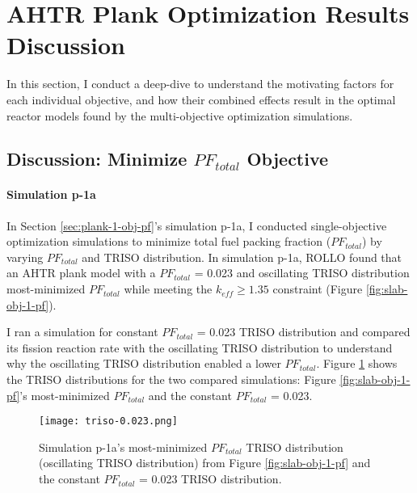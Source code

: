 \section{AHTR Plank Optimization Results Discussion}
\label{sec:plank-discussion}
In this section, I conduct a deep-dive to understand the motivating factors for 
each individual objective, and how their combined effects result in the optimal 
reactor models found by the multi-objective optimization simulations. 

\subsection{Discussion: Minimize $PF_{total}$ Objective}
\label{sec:plank-discussion-pf}
\paragraph{Simulation p-1a}
In Section \ref{sec:plank-1-obj-pf}'s simulation p-1a, I conducted single-objective 
optimization simulations to minimize total fuel packing fraction ($PF_{total}$) by 
varying $PF_{total}$ and TRISO distribution. 
In simulation p-1a, \gls{ROLLO} found that an \gls{AHTR} plank model with a
$PF_{total}$ = 0.023 and oscillating TRISO distribution most-minimized 
$PF_{total}$ while meeting the $k_{eff} \geq 1.35$ constraint 
(Figure \ref{fig:slab-obj-1-pf}). 

I ran a simulation for constant $PF_{total}$ = 0.023 TRISO distribution and compared its 
fission reaction rate with the oscillating TRISO distribution 
to understand why the oscillating TRISO distribution enabled a lower $PF_{total}$. 
Figure \ref{fig:triso-0.023} shows the TRISO distributions for the two compared 
simulations: Figure \ref{fig:slab-obj-1-pf}'s most-minimized $PF_{total}$ 
and the constant $PF_{total}$ = 0.023. 
\begin{figure}[htbp!]
    \centering
    \texttt{[image: triso-0.023.png]} 
    \caption{Simulation p-1a's most-minimized $PF_{total}$ TRISO distribution 
    (oscillating TRISO distribution) from Figure \ref{fig:slab-obj-1-pf} and the 
    constant $PF_{total}$ = 0.023 TRISO distribution.}
    \label{fig:triso-0.023}
\end{figure}

